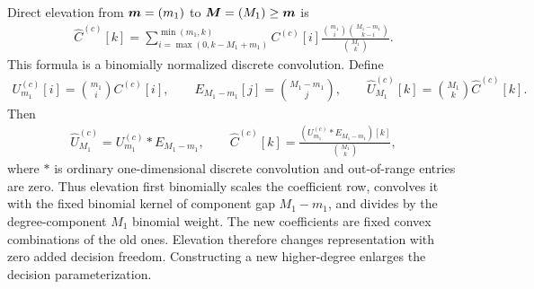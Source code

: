 Direct elevation from $\boldsymbol{m}=(m_1)$ to $\boldsymbol{M}=(M_1)\ge\boldsymbol{m}$ is
\begin{gather*}
  \widehat C^{(c)}[k]=
  \sum_{i=\max(0,k-M_1+m_1)}^{\min(m_1,k)}
C^{(c)}[i]\frac{\binom{m_1}{i}\binom{M_1-m_1}{k-i}}{\binom{M_1}{k}}.
\end{gather*}
This formula is a binomially normalized discrete convolution. Define
\begin{gather*}
  U_{m_1}^{(c)}[i]=\binom{m_1}{i} C^{(c)}[i],
  \qquad
  E_{M_1-m_1}[j]=\binom{M_1-m_1}{j},
  \qquad
  \widehat U_{M_1}^{(c)}[k]=\binom{M_1}{k}\widehat C^{(c)}[k].
\end{gather*}
Then
\begin{gather*}
  \widehat U_{M_1}^{(c)}=U_{m_1}^{(c)}*E_{M_1-m_1},
  \qquad
  \widehat C^{(c)}[k]
  =\frac{(U_{m_1}^{(c)}*E_{M_1-m_1})[k]}{\binom{M_1}{k}},
\end{gather*}
where $*$ is ordinary one-dimensional discrete convolution and out-of-range entries are zero. Thus elevation first binomially scales the coefficient row, convolves it with the fixed binomial kernel of component gap $M_1-m_1$, and divides by the degree-component $M_1$ binomial weight. The new coefficients are fixed convex combinations of the old ones. Elevation therefore changes representation with zero added decision freedom. Constructing a new higher-degree  enlarges the decision parameterization.

